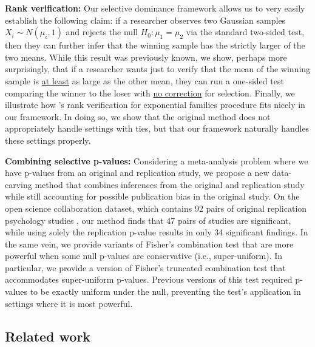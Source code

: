 \documentclass{article}
\begin{document}
\noindent \textbf{Rank verification: } Our selective dominance framework allows us to very easily establish the following claim: if a researcher observes two Gaussian samples $X_i \sim N(\mu_i, 1)$  and rejects the null $H_0: \mu_1 = \mu_2$ via the standard two-sided test, then they can further infer that the winning sample has the strictly larger of the two means. While this result was previously known, we show, perhaps more surprisingly, that if a researcher wants just to verify that the mean of the winning sample is \underline{at least} as large as the other mean, they can run a one-sided test comparing the winner to the loser with \underline{no correction} for selection. Finally, we illustrate how \cite{Hung2019}'s rank verification for exponential families procedure fits nicely in our framework. In doing so, we show that the original method does not appropriately handle settings with ties, but that our framework naturally handles these settings properly. \newline 

\noindent \textbf{Combining selective p-values: } Considering a meta-analysis problem where we have p-values from an original and replication study, we propose a new data-carving method that combines inferences from the original and replication study while still accounting for possible publication bias in the original study. On the open science collaboration dataset, which contains 92 pairs of original replication psychology studies \cite{OSF}, our method finds that 47 pairs of studies are significant, while using solely the replication p-value results in only 34 significant findings. In the same vein, we provide variants of Fisher's combination test that are more powerful when some null p-values are conservative (i.e., super-uniform). In particular, we provide a version of Fisher's truncated combination test \citep{Zaykin} that accommodates super-uniform p-values. Previous versions of this test required p-values to be exactly uniform under the null, preventing the test's application in settings where it is most powerful. 

\subsection{Related work}
\end{document}
